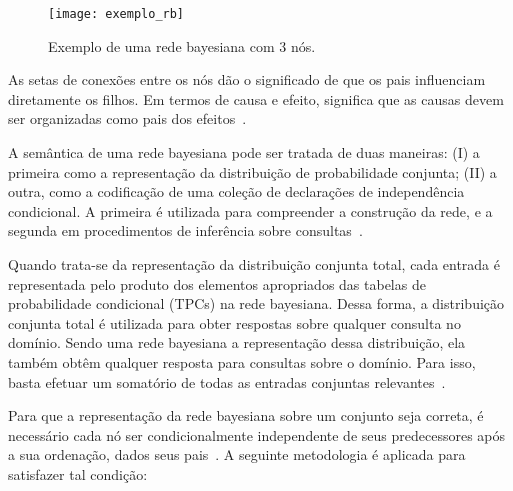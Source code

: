 \begin{figure}[ht!]
    \centering
    \begin{minipage}{0.7\textwidth}
        \caption{Exemplo de uma rede bayesiana com 3 nós.}
        \texttt{[image: exemplo\_rb]}
        \label{fig:experimento}
    \end{minipage}
\end{figure}

As setas de conexões entre os nós dão o significado de que os pais influenciam diretamente os filhos. Em termos de causa e efeito, significa que as causas devem ser organizadas como pais dos efeitos~\cite{russell:2002}.

A semântica de uma rede bayesiana pode ser tratada de duas maneiras: (I) a primeira como a representação da distribuição de probabilidade conjunta; (II) a outra, como a codificação de uma coleção de declarações de independência condicional. A primeira é utilizada para compreender a construção da rede, e a segunda em procedimentos de inferência sobre consultas~\cite{russell:2002}.

Quando trata-se da representação da distribuição conjunta total, cada entrada é representada pelo produto dos elementos apropriados das tabelas de probabilidade condicional (TPCs) na rede bayesiana. Dessa forma, a distribuição conjunta total é utilizada para obter respostas sobre qualquer consulta no domínio. Sendo uma rede bayesiana a representação dessa distribuição, ela também obtêm qualquer resposta para consultas sobre o domínio. Para isso, basta efetuar um somatório de todas as entradas conjuntas relevantes~\cite{russell:2002}.

Para que a representação da rede bayesiana sobre um conjunto seja correta, é necessário cada nó ser condicionalmente independente de seus predecessores após a sua ordenação, dados seus pais~\cite{russell:2002}. A seguinte metodologia é aplicada para satisfazer tal condição:


